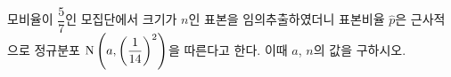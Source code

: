 모비율이 $\dfrac{5}{7}$인 모집단에서 크기가 $n$인 표본을 임의추출하였더니 표본비율 $\hat{p}$은 근사적으로 정규분포 $\mathrm{N}\left(a{,}\mkern3mu\mathopen{}\left(\dfrac{1}{14}\right)^2\right)$을 따른다고 한다. 이때 $a$, $n$의 값을 구하시오. 
